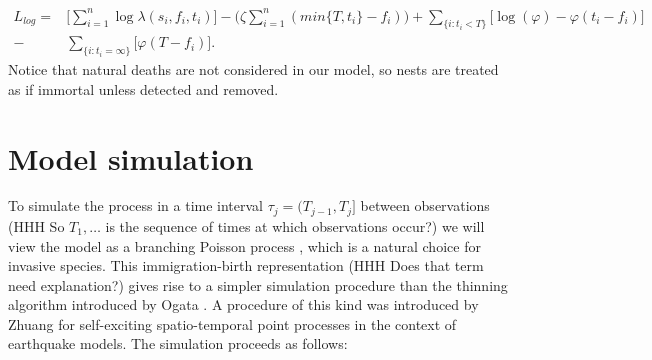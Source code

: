 \documentclass{article}
\begin{document}
\begin{equation*}
    \begin{aligned}
        L_{log} = & \Bigg[ \sum_{i = 1}^{n} \log \lambda(s_{i},f_{i}, t_{i}) \Bigg] - \bigg(\zeta \sum_{i=1}^{n} (min\{ T, t_i \} - f_i) \bigg)  + \sum_{\{ i : t_{i} < T \} }  \bigg[\log (\varphi) -\varphi(t_{i} - f_{i}) \bigg] \\
        - & \sum_{ \{ i : t_{i} = \infty \} } \bigg[\varphi(T - f_{i}) \bigg].
    \end{aligned}
\end{equation*}
Notice that natural deaths are not considered in our model, so nests are treated as if immortal unless detected and removed.

\section{Model simulation} \label{section:simulationModel}

To simulate the process in a time interval $\tau_j = (T_{j-1}, T_j]$ between observations (HHH So $T_1, \ldots$ is the sequence of times at which observations occur?) we will view the model as a branching Poisson process \cite{Lewis}, which is a natural choice for invasive species. This immigration-birth representation (HHH Does that term need explanation?) gives rise to a simpler simulation procedure than the thinning algorithm introduced by Ogata \cite{Ogata81}. A procedure of this kind was introduced by Zhuang \cite{Zhuang} for self-exciting spatio-temporal point processes in the context of earthquake models. The simulation proceeds as follows:
\end{document}
